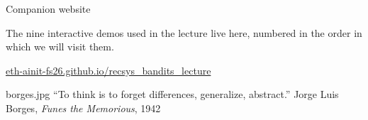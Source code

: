 
\renewcommand{\AINITsection}{}
\AINITmaketitle

\begin{frame}{Companion website}
  \vspace{0.6em}
  \begin{center}
    \rmfamily
    The nine interactive demos used in the lecture live here, numbered
    in the order in which we will visit them.
  \end{center}

  \vspace{2.0em}
  \begin{center}
    {\large\color{accentOxblood}%
      \href{https://eth-ainit-fs26.github.io/recsys_bandits_lecture/}%
           {eth-ainit-fs26.github.io/recsys\_bandits\_lecture}}
  \end{center}
\end{frame}

\sectiondividerwithportrait%
  {borges.jpg}%
  {``To think is to forget differences, generalize, abstract.''}%
  {Jorge Luis Borges, \textit{Funes the Memorious}, 1942}%
  {}%

